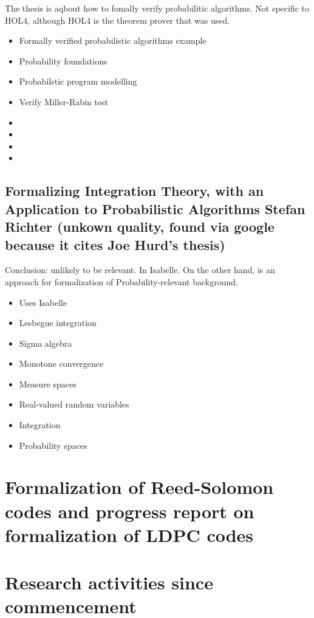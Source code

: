 \documentclass{article}
\begin{document}
The thesis is aqbout how to fomally verify probabilitic algorithms. Not specific to HOL4, although HOL4 is the theorem prover that was used.

\begin{itemize}
\item {Formally verified probabilistic algorithms example}
\item {Probability foundations}
\item {Probabilstic program modelling}
\item {Verify Miller-Rabin test}
\item {}
\item {}
\item {}
\item {}
\end{itemize}


\subsection{Formalizing Integration Theory, with an
Application to Probabilistic Algorithms
Stefan Richter 
(unkown quality, found via google because it cites Joe Hurd's thesis)}

Conclusion: unlikely to be relevant. In Isabelle. On the other hand, is an approach for formalization of Probability-relevant background.

\begin{itemize}
\item {Uses Isabelle}
\item {Lesbegue integration}
\item {Sigma algebra}
\item {Monotone convergence}
\item {Measure spaces}
\item {Real-valued random variables}
\item {Integration}
\item{Probability spaces}
\end{itemize}

\section{Formalization of Reed-Solomon codes and progress report on formalization of LDPC codes}

\section{Research activities since commencement}
\end{document}
